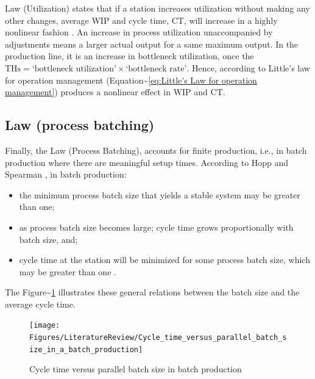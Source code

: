 \documentclass{article}
\begin{document}
Law (Utilization) states that if a station increases utilization without making any other changes, average WIP and cycle time, CT, will increase in a highly nonlinear fashion \citep[p.303]{Hopp2001}.
An increase in process utilization unaccompanied by adjustments means a larger actual output for a same maximum output.
In the production line, it is an increase in bottleneck utilization, once the \(\mbox{THs} = \mbox{`bottleneck utilization'}\times\mbox{`bottleneck rate'}\).
Hence, according to Little's law for operation management (Equation\textasciitilde{}\ref{eq:Little's Law for operation management}) produces a nonlinear effect in WIP and CT.

\subsection{Law (process batching)}

Finally, the Law (Process Batching), accounts for finite production, i.e., in batch production where there are meaningful setup times.
According to Hopp and Spearman \cite{Hopp2001}, in batch production:

\begin{itemize}
    \item the minimum process batch size that yields a stable system may be greater than one;
    \item as process batch size becomes large; cycle time grows proportionally with batch size, and;
    \item cycle time at the station will be minimized for some process batch size, which may be greater than one \citep[p.306]{Hopp2001}.
\end{itemize}

The Figure\textasciitilde{}\ref{fig:Cycle time versus parallel batch size in batch production} illustrates these general relations between the batch size and the average cycle time.

\begin{figure}[H]
  \centering
  \texttt{[image: Figures/LiteratureReview/Cycle\_time\_versus\_parallel\_batch\_size\_in\_a\_batch\_production]}
  \caption{Cycle time versus parallel batch size in batch production}\label{fig:Cycle time versus parallel batch size in batch production}
\end{figure}
\end{document}
